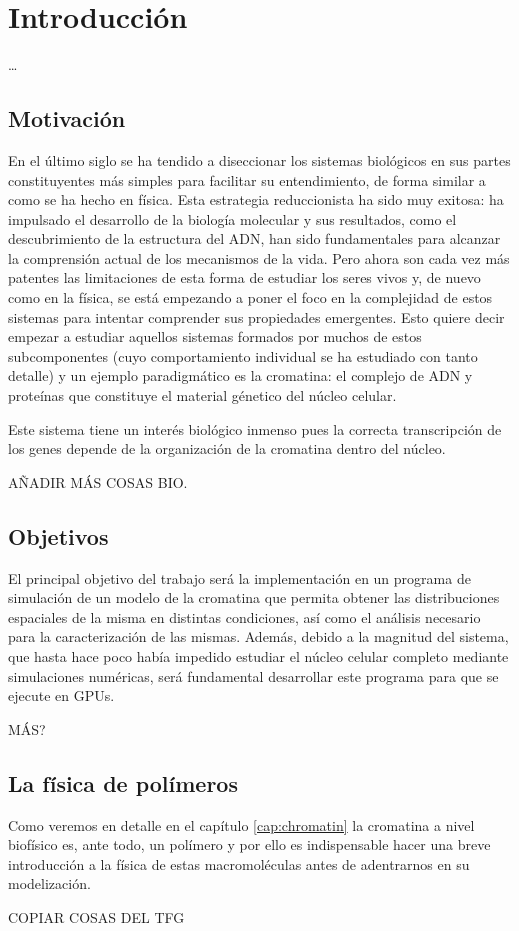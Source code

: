 \chapter{Introducción}
\label{cap:introduction}

\dots

\section{Motivación}

En el último siglo se ha tendido a diseccionar los sistemas biológicos en sus partes constituyentes más simples para facilitar su entendimiento, de forma similar a como se ha hecho en física. Esta estrategia reduccionista ha sido muy exitosa: ha impulsado el desarrollo de la biología molecular y sus resultados, como el descubrimiento de la estructura del ADN, han sido fundamentales para alcanzar la comprensión actual de los mecanismos de la vida. Pero ahora son cada vez más patentes las limitaciones de esta forma de estudiar los seres vivos y, de nuevo como en la física, se está empezando a poner el foco en la complejidad de estos sistemas para intentar comprender sus propiedades emergentes. Esto quiere decir empezar a estudiar aquellos sistemas formados por muchos de estos subcomponentes (cuyo comportamiento individual se ha estudiado con tanto detalle) y un ejemplo paradigmático es la cromatina: el complejo de ADN y proteínas que constituye el material génetico del núcleo celular.

Este sistema tiene un interés biológico inmenso pues la correcta transcripción de los genes depende de la organización de la cromatina dentro del núcleo.

AÑADIR MÁS COSAS BIO.

\section{Objetivos}

El principal objetivo del trabajo será la implementación en un programa de simulación de un modelo de la cromatina que permita obtener las distribuciones espaciales de la misma en distintas condiciones, así como el análisis necesario para la caracterización de las mismas. Además, debido a la magnitud del sistema, que hasta hace poco había impedido estudiar el núcleo celular completo mediante simulaciones numéricas, será fundamental desarrollar este programa para que se ejecute en GPUs.

MÁS?

\section{La física de polímeros}

Como veremos en detalle en el capítulo \ref{cap:chromatin} la cromatina a nivel biofísico es, ante todo, un polímero y por ello es indispensable hacer una breve introducción a la física de estas macromoléculas antes de adentrarnos en su modelización.

COPIAR COSAS DEL TFG
